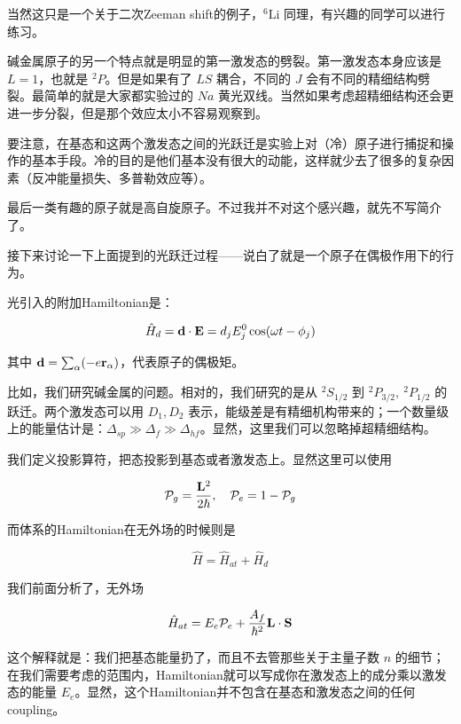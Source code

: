 当然这只是一个关于二次Zeeman shift的例子，$^6{\text{Li}}$ 同理，有兴趣的同学可以进行练习。

碱金属原子的另一个特点就是明显的第一激发态的劈裂。第一激发态本身应该是 $L=1$，也就是 $^2P$。但是如果有了 $LS$ 耦合，不同的 $J$ 会有不同的精细结构劈裂。最简单的就是大家都实验过的 $Na$ 黄光双线。当然如果考虑超精细结构还会更进一步分裂，但是那个效应太小不容易观察到。

要注意，在基态和这两个激发态之间的光跃迁是实验上对（冷）原子进行捕捉和操作的基本手段。冷的目的是他们基本没有很大的动能，这样就少去了很多的复杂因素（反冲能量损失、多普勒效应等）。

最后一类有趣的原子就是高自旋原子。不过我并不对这个感兴趣，就先不写简介了。

接下来讨论一下上面提到的光跃迁过程——说白了就是一个原子在偶极作用下的行为。

光引入的附加Hamiltonian是：

\begin{equation}
\hat{H}_d = {\bf d\cdot E} = d_j E_j^0 \cos(\omega t-\phi_j)
\end{equation}

其中 ${\bf d} = \sum_\alpha (-e{\bf r}_\alpha)$，代表原子的偶极矩。

比如，我们研究碱金属的问题。相对的，我们研究的是从 $^2S_{1/2}$ 到 $^2P_{3/2},\ ^2P_{1/2}$ 的跃迁。两个激发态可以用 $D_1,D_2$ 表示，能级差是有精细机构带来的；一个数量级上的能量估计是：$\Delta_{sp} \gg \Delta_f \gg \Delta_{hf}$。显然，这里我们可以忽略掉超精细结构。

我们定义投影算符，把态投影到基态或者激发态上。显然这里可以使用

\begin{equation}
\mathcal{P}_g = \frac{{\bf L}^2}{2\hbar},\quad \mathcal{P}_e = 1 - \mathcal{P}_g
\end{equation}

而体系的Hamiltonian在无外场的时候则是

\begin{equation}
\hat{H} = \hat{H}_{at}+\hat{H}_d
\end{equation}

我们前面分析了，无外场

\begin{equation}
\hat{H}_{at} = E_e\mathcal{P}_e + \frac{A_{f}}{\hbar^2}\bf L\cdot S
\end{equation}

这个解释就是：我们把基态能量扔了，而且不去管那些关于主量子数 $n$ 的细节；在我们需要考虑的范围内，Hamiltonian就可以写成你在激发态上的成分乘以激发态的能量 $E_e$。显然，这个Hamiltonian并不包含在基态和激发态之间的任何coupling。

